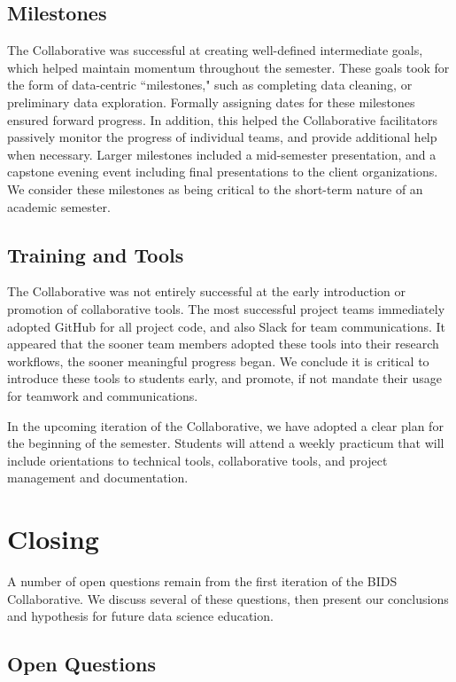\documentclass[12pt]{article}
\begin{document}
\subsection{Milestones}

The Collaborative was successful at creating well-defined intermediate goals, which helped maintain momentum throughout the semester.  These goals took for the form of data-centric ``milestones," such as completing data cleaning, or preliminary data exploration.  Formally assigning dates for these milestones ensured forward progress.  In addition, this helped the Collaborative facilitators passively monitor the progress of individual teams, and provide additional help when necessary.  Larger milestones included a mid-semester presentation, and a capstone evening event including final presentations to the client organizations.  We consider these milestones as being critical to the short-term nature of an academic semester.

\subsection{Training and Tools}

The Collaborative was not entirely successful at the early introduction or promotion of collaborative tools.  The most successful project teams immediately adopted GitHub for all project code, and also Slack for team communications.  It appeared that the sooner team members adopted these tools into their research workflows, the sooner meaningful progress began.  We conclude it is critical to introduce these tools to students early, and promote, if not mandate their usage for teamwork and communications.

In the upcoming iteration of the Collaborative, we have adopted a clear plan for the beginning of the semester. Students will attend a weekly practicum that will include orientations to technical tools, collaborative tools, and project management and documentation.



\section{Closing}

A number of open questions remain from the first iteration of the BIDS Collaborative.  We discuss several of these questions, then present our conclusions and hypothesis for future data science education.

\subsection{Open Questions}
\end{document}
